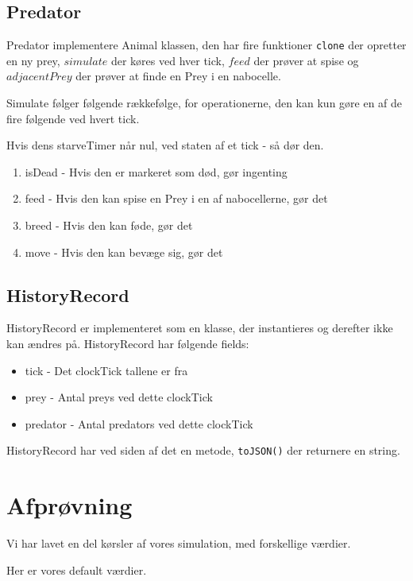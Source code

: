\documentclass[a4paper]{article}
\begin{document}
    \subsection*{Predator}
      Predator implementere Animal klassen,
      den har fire funktioner \lstinline$clone$ der opretter en ny prey,
      $simulate$ der køres ved hver tick, $feed$ der prøver at spise
      og $adjacentPrey$ der prøver at finde en Prey i en nabocelle.

      Simulate følger følgende rækkefølge, for operationerne,
      den kan kun gøre en af de fire følgende ved hvert tick.

      Hvis dens starveTimer når nul, ved staten af et tick - så dør den.

      \begin{enumerate}
        \item isDead - Hvis den er markeret som død, gør ingenting
        \item feed - Hvis den kan spise en Prey i en af nabocellerne, gør det
        \item breed - Hvis den kan føde, gør det
        \item move - Hvis den kan bevæge sig, gør det
      \end{enumerate}
    
    \subsection*{HistoryRecord}
      HistoryRecord er implementeret som en klasse, der instantieres og derefter ikke kan ændres på.
      HistoryRecord har følgende fields:
      \begin{itemize}
        \item tick - Det clockTick tallene er fra
        \item prey - Antal preys ved dette clockTick
        \item predator - Antal predators ved dette clockTick
      \end{itemize}
      HistoryRecord har ved siden af det en metode, \lstinline$toJSON()$ der returnere en string.
      
  \section{Afprøvning} \label{sec:unitTest}

    Vi har lavet en del kørsler af vores simulation,
    med forskellige værdier.

    Her er vores default værdier.
    
\end{document}
